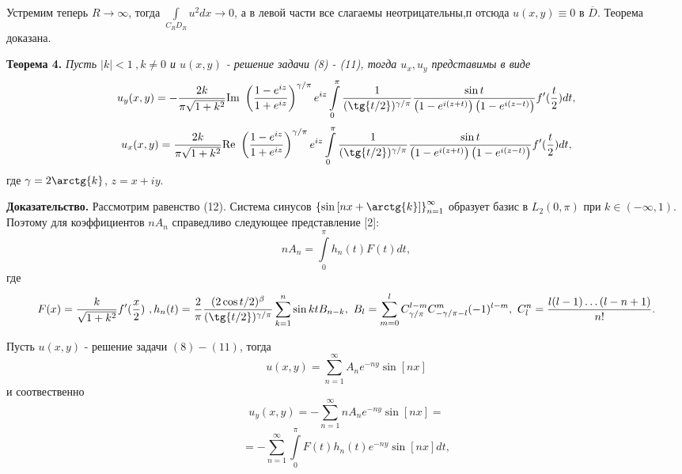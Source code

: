 \documentclass[9pt]{article}
\begin{document}
Устремим теперь $R \to \infty$, тогда $\int\limits_{C_RD_R} u^2 dx \to 0$, а в левой части все слагаемы неотрицательны,п отсюда $u(x,y) \equiv 0$ в $\overline{D}$. Теорема доказана.
\par
\textbf{Теорема 4.} \textit{Пусть $|k| < 1\  , k \neq 0$ и $u(x,y)$  - решение задачи (8) - (11), тогда $u_x, u_y$ представимы в виде}
\begin{equation*}
		u_y(x,y) = -\dfrac{2k}{\pi\sqrt{1+k^2}} \mathrm{Im}\ \left(\dfrac{1- e^{iz}}{1 + e^{iz}} \right)^{\gamma/\pi} e^{iz}\int\limits_0^\pi \dfrac{1}{(\tg{t/2})^{\gamma/\pi}}  \dfrac{ \sin{t}}{\left(1 - e^{i(z+t)} \right) \left(1 - e^{i(z-t)}\right)}  f'(\dfrac{t}{2}) dt, 
\end{equation*}
\begin{equation*}
	u_x(x,y) = \dfrac{2k}{\pi\sqrt{1+k^2}} \mathrm{Re}\ \left(\dfrac{1- e^{iz}}{1 + e^{iz}} \right)^{\gamma/\pi} e^{iz}\int\limits_0^\pi \dfrac{1}{(\tg{t/2})^{\gamma/\pi}}  \dfrac{ \sin{t}}{\left(1 - e^{i(z+t)} \right) \left(1 - e^{i(z-t)}\right)}  f'(\dfrac{t}{2}) dt,
\end{equation*}
где $\gamma = 2\arctg{k}$, $z = x + iy$.
\par
\textbf{Доказательство.} Рассмотрим равенство (12). Система синусов $\left\{\sin{\left[nx + \arctg{k}\right]}\right\}_{n=1}^{\infty}$ образует базис в $L_2(0,\pi)$ при $k \in (-\infty, 1)$. Поэтому для коэффициентов $nA_n$ справедливо следующее представление [2]:
\begin{equation*}
	nA_n = \int\limits_0^\pi h_{n}(t) F(t)dt, 
\end{equation*}
где
\begin{equation*}
	F(x) = \dfrac{k}{\sqrt{1+k^2}} f'(\dfrac{x}{2})\ , h_n(t) = \dfrac{2}{\pi}\dfrac{(2\cos{t/2})^\beta}{(\tg{t/2})^{\gamma/\pi}} \sum\limits_{k=1}^n \sin{kt} B_{n-k}, \ B_{l} = \sum\limits_{m=0}^{l} C_{\gamma/\pi}^{l-m} C_{-\gamma / \pi -l}^{m} (-1)^{l-m}, \ C_l^n = \dfrac{l(l-1)\dots (l-n+1)}{n!}. 
\end{equation*}
\par
Пусть $u(x,y)$ - решение задачи $(8) - (11)$, тогда
\begin{equation*}
	u(x,y) = \sum\limits_{n=1}^{\infty} A_n e^{-ny} \sin{\left[nx\right]}
\end{equation*}
и соотвественно
\begin{equation*}
	u_y(x,y) = -\sum\limits_{n=1}^{\infty} nA_n e^{-ny} \sin{\left[nx\right]}=
\end{equation*}
\begin{equation*}
	= - \sum\limits_{n=1}^{\infty}  \int\limits_0^\pi F(t)  h_{n}(t)  e^{-ny} \sin{\left[nx\right]} dt, 
\end{equation*}
\end{document}
